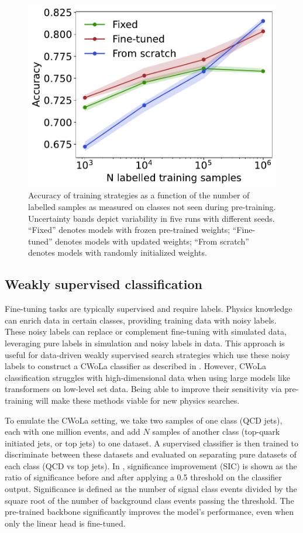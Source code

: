 \begin{figure}[tp!]
    \centering
    \includegraphics[width=0.5\columnwidth]{Figures/foundation_models/mpm1/jetclass_nc_two_40_accuracy.pdf}
    \caption{Accuracy of training strategies as a function of the number of labelled samples as measured on classes not seen during pre-training.
        Uncertainty bands depict variability in five runs with different seeds.
        ``Fixed'' denotes models with frozen pre-trained weights; ``Fine-tuned'' denotes models with updated weights; ``From scratch'' denotes models with randomly initialized weights.}
    \label{fig:fine_tune_jetclass_ood}
\end{figure}

\subsection{Weakly supervised classification}

Fine-tuning tasks are typically supervised and require labels.
Physics knowledge can enrich data in certain classes, providing training data with noisy labels.
These noisy labels can replace or complement fine-tuning with simulated data, leveraging pure labels in simulation and noisy labels in data.
This approach is useful for data-driven weakly supervised search strategies which use these noisy labels to construct a CWoLa classifier as described in .
However, CWoLa classification struggles with high-dimensional data when using large models like transformers on low-level set data.
Being able to improve their sensitivity via pre-training will make these methods viable for new physics searches.

To emulate the CWoLa setting, we take two samples of one class (QCD jets), each with one million events, and add $N$ samples of another class (top-quark initiated jets, or top jets) to one dataset.
A supervised classifier is then trained to discriminate between these datasets and evaluated on separating pure datasets of each class (QCD vs top jets).
In , significance improvement (SIC) is shown as the ratio of significance before and after applying a 0.5 threshold on the classifier output.
Significance is defined as the number of signal class events divided by the square root of the number of background class events passing the threshold.
The pre-trained backbone significantly improves the model's performance, even when only the linear head is fine-tuned.

